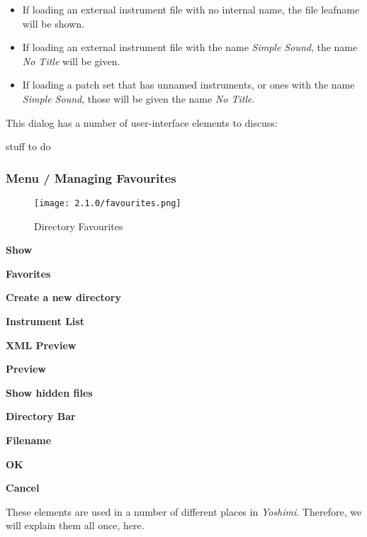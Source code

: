    \begin{itemize}
      \item If loading an external instrument file with no internal name,
         the file leafname will be shown.
      \item If loading an external instrument file with the name
         \textsl{Simple Sound}, the name \textsl{No Title} will be given.
      \item If loading a patch set that has unnamed instruments, or ones with
         the name \textsl{Simple Sound}, those will be given the name \textsl{No
         Title}.
   \end{itemize}

   This dialog has a number of user-interface elements to discuss:

   stuff to do

\subsubsection{Menu / Managing Favourites}
\label{subsubsec:menu_favourites}
   \begin{figure}[H]
   \centering
   \texttt{[image: 2.1.0/favourites.png]}
   \caption{Directory Favourites}
   \label{fig:favourites}
\end{figure}

\iffalse
   \begin{enumber}
      \item \textbf{Show}
      \item \textbf{Favorites}
      \item \textbf{Create a new directory}
      \item \textbf{Instrument List}
      \item \textbf{XML Preview}
      \item \textbf{Preview}
      \item \textbf{Show hidden files}
      \item \textbf{Directory Bar}
      \item \textbf{Filename}
      \item \textbf{OK}
      \item \textbf{Cancel}
   \end{enumber}

   These elements are used in a number of different places in
   \textsl{Yoshimi}.
   Therefore, we will explain them all once, here.

   \setcounter{ItemCounter}{0}      %

